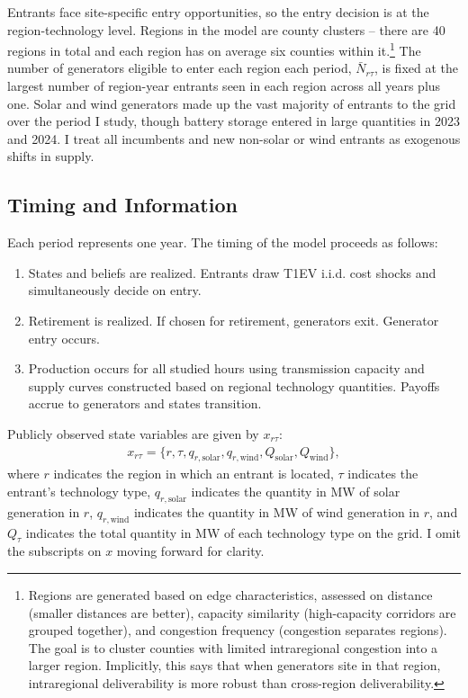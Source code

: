 \documentclass[12pt]{article}
\begin{document}
Entrants face site-specific entry opportunities, so the entry decision is at the region-technology level. Regions in the model are county clusters -- there are 40 regions in total and each region has on average six counties within it.\footnote{Regions are generated based on edge characteristics, assessed on distance (smaller distances are better), capacity similarity (high-capacity corridors are grouped together), and congestion frequency (congestion separates regions). The goal is to cluster counties with limited intraregional congestion into a larger region. Implicitly, this says that when generators site in that region, intraregional deliverability is more robust than cross-region deliverability.} The number of generators eligible to enter each region each period, $\bar{N}_{r\tau}$, is fixed at the largest number of region-year entrants seen in each region across all years plus one. Solar and wind generators made up the vast majority of entrants to the grid over the period I study, though battery storage entered in large quantities in 2023 and 2024. I treat all incumbents and new non-solar or wind entrants as exogenous shifts in supply. 

\subsection{Timing and Information}

Each period represents one year. The timing of the model proceeds as follows:
\begin{enumerate}
    \item States and beliefs are realized. Entrants draw T1EV i.i.d. cost shocks and simultaneously decide on entry. 
    \item Retirement is realized. If chosen for retirement, generators exit. Generator entry occurs.
    \item Production occurs for all studied hours using transmission capacity and supply curves constructed based on regional technology quantities. Payoffs accrue to generators and states transition.
\end{enumerate}

Publicly observed state variables are given by $x_{r\tau}$:
\begin{align*}
   x_{r\tau} = \{r, \tau, q_{r,\mathrm{solar}}, q_{r,\mathrm{wind}}, Q_{\mathrm{solar}}, Q_{\mathrm{wind}} \},
\end{align*}
where $r$ indicates the region in which an entrant is located, $\tau$ indicates the entrant's technology type, $q_{r,\mathrm{solar}}$ indicates the quantity in MW of solar generation in $r$, $q_{r,\mathrm{wind}}$ indicates the quantity in MW of wind generation in $r$, and $Q_\tau$ indicates the total quantity in MW of each technology type on the grid. I omit the subscripts on $x$ moving forward for clarity.
\end{document}
